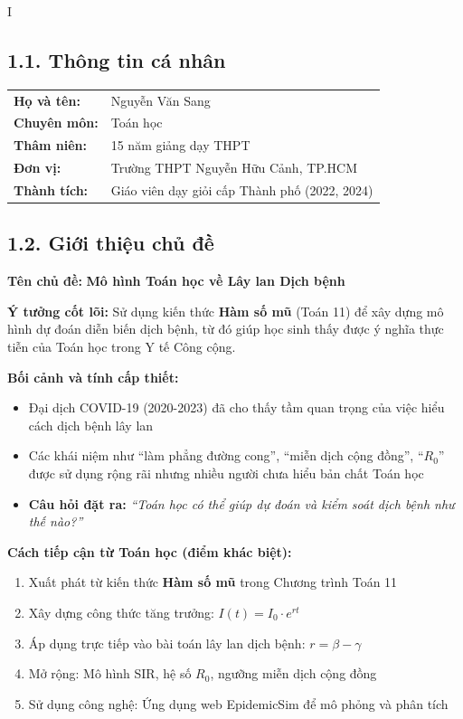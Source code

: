\documentclass[12pt,a4paper]{article}
\begin{document}
\begin{competitionsection}{I}
\vspace{0.5cm}

\subsection*{1.1. Thông tin cá nhân}
\begin{tabularx}{\textwidth}{@{} l X @{}}
\textbf{Họ và tên:} & Nguyễn Văn Sang \\
\textbf{Chuyên môn:} & Toán học \\
\textbf{Thâm niên:} & 15 năm giảng dạy THPT \\
\textbf{Đơn vị:} & Trường THPT Nguyễn Hữu Cảnh, TP.HCM \\
\textbf{Thành tích:} & Giáo viên dạy giỏi cấp Thành phố (2022, 2024) \\
\end{tabularx}

\subsection*{1.2. Giới thiệu chủ đề}

\begin{highlightbox}
\textbf{\large\color{accent} Tên chủ đề:} \textcolor{mathblue}{\textbf{Mô hình Toán học về Lây lan Dịch bệnh}}

\textbf{Ý tưởng cốt lõi:} Sử dụng kiến thức \textbf{Hàm số mũ} (Toán 11) để xây dựng mô hình dự đoán diễn biến dịch bệnh, từ đó giúp học sinh thấy được ý nghĩa thực tiễn của Toán học trong Y tế Công cộng.
\end{highlightbox}

\vspace{0.3cm}
\textbf{Bối cảnh và tính cấp thiết:}
\begin{itemize}
\item Đại dịch COVID-19 (2020-2023) đã cho thấy tầm quan trọng của việc hiểu cách dịch bệnh lây lan
\item Các khái niệm như ``làm phẳng đường cong'', ``miễn dịch cộng đồng'', ``$R_0$'' được sử dụng rộng rãi nhưng nhiều người chưa hiểu bản chất Toán học
\item \textbf{Câu hỏi đặt ra:} \textit{``Toán học có thể giúp dự đoán và kiểm soát dịch bệnh như thế nào?''}
\end{itemize}

\textbf{Cách tiếp cận từ Toán học (điểm khác biệt):}
\begin{enumerate}
\item Xuất phát từ kiến thức \textbf{Hàm số mũ} trong Chương trình Toán 11
\item Xây dựng công thức tăng trưởng: $I(t) = I_0 \cdot e^{rt}$
\item Áp dụng trực tiếp vào bài toán lây lan dịch bệnh: $r = \beta - \gamma$
\item Mở rộng: Mô hình SIR, hệ số $R_0$, ngưỡng miễn dịch cộng đồng
\item Sử dụng công nghệ: Ứng dụng web EpidemicSim để mô phỏng và phân tích
\end{enumerate}


\end{competitionsection}
\end{document}
